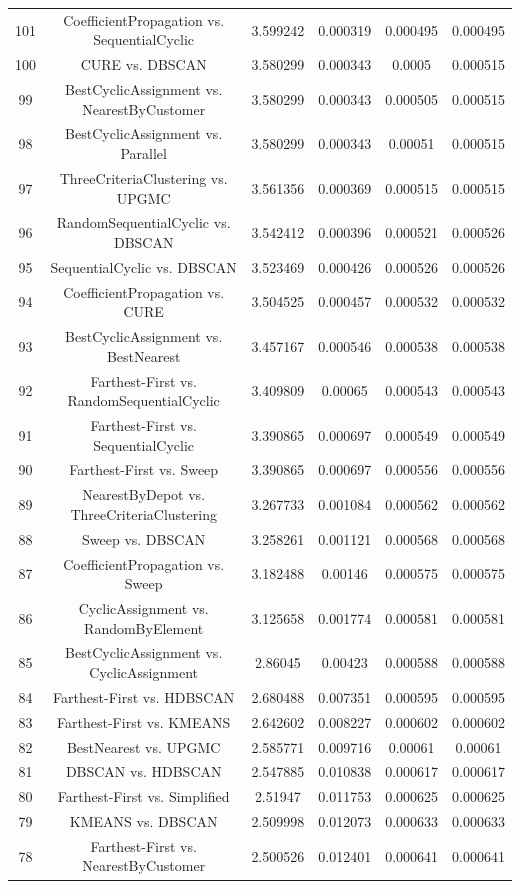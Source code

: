 \documentclass[a4paper,10pt]{article}
\begin{document}
\begin{landscape}
\begin{table}[!htp]
\begin{tabular}{cccccc}
101&CoefficientPropagation vs. SequentialCyclic&3.599242&0.000319&0.000495&0.000495\\
100&CURE vs. DBSCAN&3.580299&0.000343&0.0005&0.000515\\
99&BestCyclicAssignment vs. NearestByCustomer&3.580299&0.000343&0.000505&0.000515\\
98&BestCyclicAssignment vs. Parallel&3.580299&0.000343&0.00051&0.000515\\
97&ThreeCriteriaClustering vs. UPGMC&3.561356&0.000369&0.000515&0.000515\\
96&RandomSequentialCyclic vs. DBSCAN&3.542412&0.000396&0.000521&0.000526\\
95&SequentialCyclic vs. DBSCAN&3.523469&0.000426&0.000526&0.000526\\
94&CoefficientPropagation vs. CURE&3.504525&0.000457&0.000532&0.000532\\
93&BestCyclicAssignment vs. BestNearest&3.457167&0.000546&0.000538&0.000538\\
92&Farthest-First vs. RandomSequentialCyclic&3.409809&0.00065&0.000543&0.000543\\
91&Farthest-First vs. SequentialCyclic&3.390865&0.000697&0.000549&0.000549\\
90&Farthest-First vs. Sweep&3.390865&0.000697&0.000556&0.000556\\
89&NearestByDepot vs. ThreeCriteriaClustering&3.267733&0.001084&0.000562&0.000562\\
88&Sweep vs. DBSCAN&3.258261&0.001121&0.000568&0.000568\\
87&CoefficientPropagation vs. Sweep&3.182488&0.00146&0.000575&0.000575\\
86&CyclicAssignment vs. RandomByElement&3.125658&0.001774&0.000581&0.000581\\
85&BestCyclicAssignment vs. CyclicAssignment&2.86045&0.00423&0.000588&0.000588\\
84&Farthest-First vs. HDBSCAN&2.680488&0.007351&0.000595&0.000595\\
83&Farthest-First vs. KMEANS&2.642602&0.008227&0.000602&0.000602\\
82&BestNearest vs. UPGMC&2.585771&0.009716&0.00061&0.00061\\
81&DBSCAN vs. HDBSCAN&2.547885&0.010838&0.000617&0.000617\\
80&Farthest-First vs. Simplified&2.51947&0.011753&0.000625&0.000625\\
79&KMEANS vs. DBSCAN&2.509998&0.012073&0.000633&0.000633\\
78&Farthest-First vs. NearestByCustomer&2.500526&0.012401&0.000641&0.000641\\

\end{tabular}
\end{table}
\end{landscape}
\end{document}
